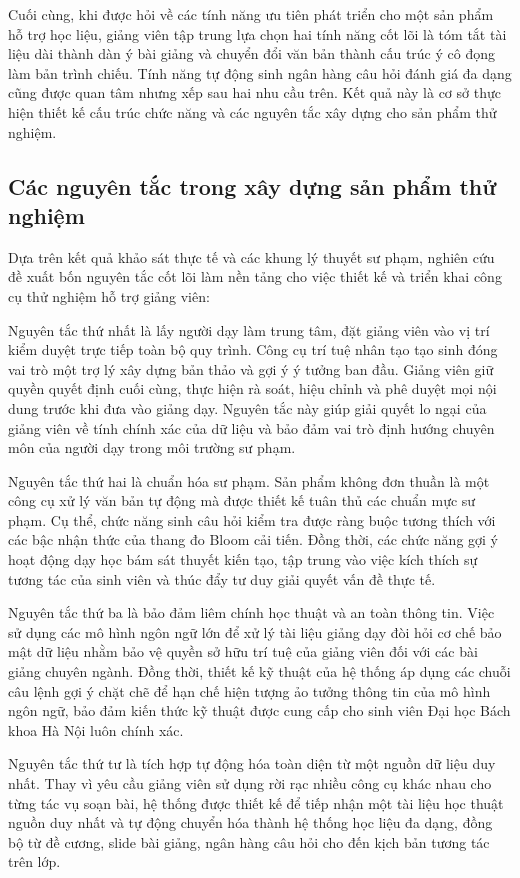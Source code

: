 Cuối cùng, khi được hỏi về các tính năng ưu tiên phát triển cho một sản phẩm hỗ trợ học liệu, giảng viên tập trung lựa chọn hai tính năng cốt lõi là tóm tắt tài liệu dài thành dàn ý bài giảng và chuyển đổi văn bản thành cấu trúc ý cô đọng làm bản trình chiếu. Tính năng tự động sinh ngân hàng câu hỏi đánh giá đa dạng cũng được quan tâm nhưng xếp sau hai nhu cầu trên. Kết quả này là cơ sở thực hiện thiết kế cấu trúc chức năng và các nguyên tắc xây dựng cho sản phẩm thử nghiệm.

\subsection{Các nguyên tắc trong xây dựng sản phẩm thử nghiệm}
Dựa trên kết quả khảo sát thực tế và các khung lý thuyết sư phạm, nghiên cứu đề xuất bốn nguyên tắc cốt lõi làm nền tảng cho việc thiết kế và triển khai công cụ thử nghiệm hỗ trợ giảng viên:

Nguyên tắc thứ nhất là lấy người dạy làm trung tâm, đặt giảng viên vào vị trí kiểm duyệt trực tiếp toàn bộ quy trình. Công cụ trí tuệ nhân tạo tạo sinh đóng vai trò một trợ lý xây dựng bản thảo và gợi ý ý tưởng ban đầu. Giảng viên giữ quyền quyết định cuối cùng, thực hiện rà soát, hiệu chỉnh và phê duyệt mọi nội dung trước khi đưa vào giảng dạy. Nguyên tắc này giúp giải quyết lo ngại của giảng viên về tính chính xác của dữ liệu và bảo đảm vai trò định hướng chuyên môn của người dạy trong môi trường sư phạm.

Nguyên tắc thứ hai là chuẩn hóa sư phạm. Sản phẩm không đơn thuần là một công cụ xử lý văn bản tự động mà được thiết kế tuân thủ các chuẩn mực sư phạm. Cụ thể, chức năng sinh câu hỏi kiểm tra được ràng buộc tương thích với các bậc nhận thức của thang đo Bloom cải tiến. Đồng thời, các chức năng gợi ý hoạt động dạy học bám sát thuyết kiến tạo, tập trung vào việc kích thích sự tương tác của sinh viên và thúc đẩy tư duy giải quyết vấn đề thực tế.

Nguyên tắc thứ ba là bảo đảm liêm chính học thuật và an toàn thông tin. Việc sử dụng các mô hình ngôn ngữ lớn để xử lý tài liệu giảng dạy đòi hỏi cơ chế bảo mật dữ liệu nhằm bảo vệ quyền sở hữu trí tuệ của giảng viên đối với các bài giảng chuyên ngành. Đồng thời, thiết kế kỹ thuật của hệ thống áp dụng các chuỗi câu lệnh gợi ý chặt chẽ để hạn chế hiện tượng ảo tưởng thông tin của mô hình ngôn ngữ, bảo đảm kiến thức kỹ thuật được cung cấp cho sinh viên Đại học Bách khoa Hà Nội luôn chính xác.

Nguyên tắc thứ tư là tích hợp tự động hóa toàn diện từ một nguồn dữ liệu duy nhất. Thay vì yêu cầu giảng viên sử dụng rời rạc nhiều công cụ khác nhau cho từng tác vụ soạn bài, hệ thống được thiết kế để tiếp nhận một tài liệu học thuật nguồn duy nhất và tự động chuyển hóa thành hệ thống học liệu đa dạng, đồng bộ từ đề cương, slide bài giảng, ngân hàng câu hỏi cho đến kịch bản tương tác trên lớp.

